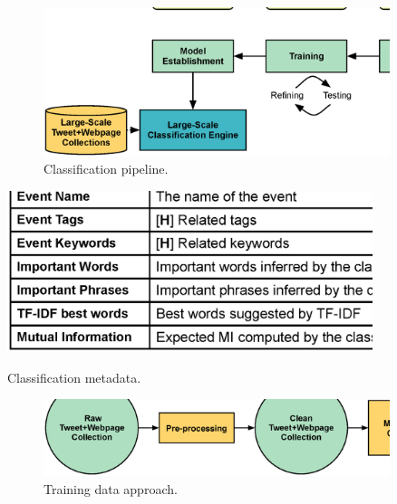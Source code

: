 \begin{figure}[t]
\centering
 \includegraphics[width=0.9\textwidth]{figs/classification-pipeline.eps}
 \caption{\small Classification pipeline.  \label{fig:pipeline}}
\end{figure}

\begin{table}[t]
\centering
 \includegraphics[width=0.8\textwidth]{figs/classmetadata.eps}
 \caption{\small Classification metadata. \label{tbl:metadata}}
\end{table}

\begin{figure}[t]
\centering
 \includegraphics[width=0.9\textwidth]{figs/trainingapproach.eps}
 \caption{\small Training data approach. \label{fig:trainingapproach}}
\end{figure}


